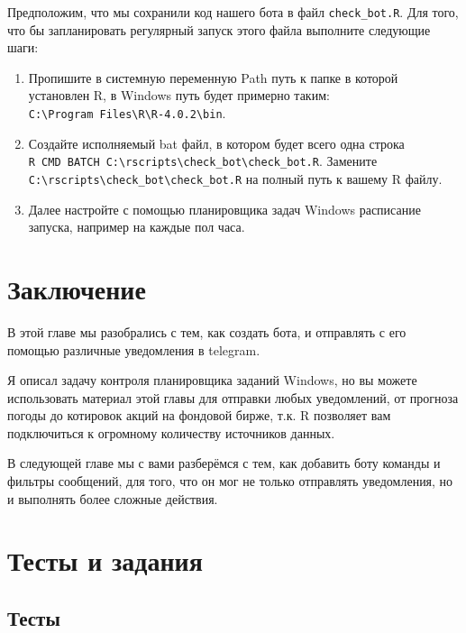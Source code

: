 \documentclass[
]{book}
\providecommand{\tightlist}{%
  \setlength{\itemsep}{0pt}\setlength{\parskip}{0pt}}
\begin{document}
Предположим, что мы сохранили код нашего бота в файл \texttt{check\_bot.R}. Для того, что бы запланировать регулярный запуск этого файла выполните следующие шаги:

\begin{enumerate}
\def\labelenumi{\arabic{enumi}.}
\tightlist
\item
  Пропишите в системную переменную Path путь к папке в которой установлен R, в Windows путь будет примерно таким: \texttt{C:\textbackslash{}Program\ Files\textbackslash{}R\textbackslash{}R-4.0.2\textbackslash{}bin}.
\item
  Создайте исполняемый bat файл, в котором будет всего одна строка \texttt{R\ CMD\ BATCH\ C:\textbackslash{}rscripts\textbackslash{}check\_bot\textbackslash{}check\_bot.R}. Замените \texttt{C:\textbackslash{}rscripts\textbackslash{}check\_bot\textbackslash{}check\_bot.R} на полный путь к вашему R файлу.
\item
  Далее настройте с помощью планировщика задач Windows расписание запуска, например на каждые пол часа.
\end{enumerate}

\hypertarget{ux437ux430ux43aux43bux44eux447ux435ux43dux438ux435}{%
\section{Заключение}\label{ux437ux430ux43aux43bux44eux447ux435ux43dux438ux435}}

В этой главе мы разобрались с тем, как создать бота, и отправлять с его помощью различные уведомления в telegram.

Я описал задачу контроля планировщика заданий Windows, но вы можете использовать материал этой главы для отправки любых уведомлений, от прогноза погоды до котировок акций на фондовой бирже, т.к. R позволяет вам подключиться к огромному количеству источников данных.

В следующей главе мы с вами разберёмся с тем, как добавить боту команды и фильтры сообщений, для того, что он мог не только отправлять уведомления, но и выполнять более сложные действия.

\hypertarget{ux442ux435ux441ux442ux44b-ux438-ux437ux430ux434ux430ux43dux438ux44f}{%
\section{Тесты и задания}\label{ux442ux435ux441ux442ux44b-ux438-ux437ux430ux434ux430ux43dux438ux44f}}

\hypertarget{ux442ux435ux441ux442ux44b}{%
\subsection{Тесты}\label{ux442ux435ux441ux442ux44b}}
\end{document}
